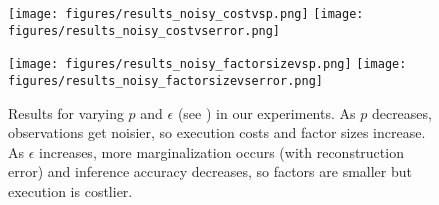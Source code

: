 \begin{figure}[t]
  \centering
    \noindent
    \texttt{[image: figures/results\_noisy\_costvsp.png]}
    \texttt{[image: figures/results\_noisy\_costvserror.png]}

    \vspace{0.7em}

    \texttt{[image: figures/results\_noisy\_factorsizevsp.png]}
    \texttt{[image: figures/results\_noisy\_factorsizevserror.png]}
    \caption{Results for varying $p$ and $\epsilon$
      (see ) in our experiments. As $p$ decreases,
      observations get noisier, so execution costs and factor sizes
      increase. As $\epsilon$ increases, more marginalization occurs
      (with reconstruction error) and inference accuracy decreases, so
      factors are smaller but execution is costlier.}
  \label{fig:noisyresults}
\end{figure}